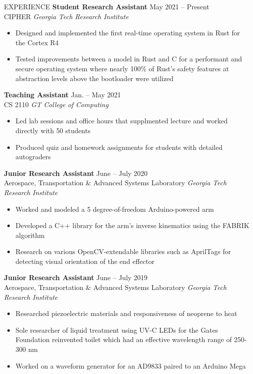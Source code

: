 \documentclass{resume} %
\begin{document}
\vspace{-1em}
\begin{rSection}{EXPERIENCE}
\textbf{Student Research Assistant} \hfill May 2021 -- Present\\
CIPHER \hfill \textit{Georgia Tech Research Institute}
\vspace{-0.5em}
 \begin{itemize}
    \itemsep -5pt {} 
     \item Designed and implemented the first real-time operating system in Rust for the Cortex R4
     \item Tested improvements between a model in Rust and C for a performant and secure operating system where
     nearly 100\% of Rust's safety features at abstraction levels above the bootloader were utilized
 \end{itemize}
\vspace{-0.5em}
\textbf{Teaching Assistant} \hfill Jan. -- May 2021\\
CS 2110 \hfill \textit{GT College of Computing}
\vspace{-0.5em}
 \begin{itemize}
    \itemsep -5pt {}
     \item Led lab sessions and office hours that supplmented lecture and worked directly with 50 students
     \item Produced quiz and homework assignments for students with detailed autograders
 \end{itemize}
\vspace{-0.5em}
\textbf{Junior Research Assistant} \hfill June -- July 2020\\
Aerospace, Transportation \& Advanced Systems Laboratory \hfill \textit{Georgia Tech Research Institute}
\vspace{-0.5em}
 \begin{itemize}
    \itemsep -5pt {} 
     \item Worked and modeled a 5 degree-of-freedom Arduino-powered arm
     \item Developed a C++ library for the arm's inverse kinematics using the FABRIK algorithm
     \item Research on various OpenCV-extendable libraries such as AprilTags for detecting visual orientation of the end effector
 \end{itemize}
 \vspace{-0.5em}
\textbf{Junior Research Assistant} \hfill June -- July 2019\\
Aerospace, Transportation \& Advanced Systems Laboratory \hfill \textit{Georgia Tech Research Institute}
\vspace{-0.5em}
 \begin{itemize}
    \itemsep -5pt {} 
     \item Researched piezoelectric materials and responsiveness of neoprene to heat
     \item Sole researcher of liquid treatment using UV-C LEDs for the Gates Foundation
     reinvented toilet which had an effective wavelength range of 250-300 nm
     \item Worked on a waveform generator for an AD9833 paired to an Arduino Mega
 \end{itemize}
\end{rSection} 
\end{document}
